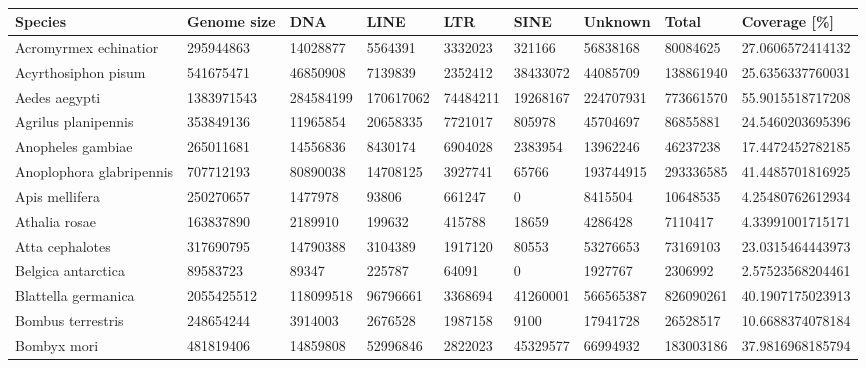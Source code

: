 \begin{table}[]
\caption{{\label{tab:coverage}}}
\begin{tabular}{@{}lllllllll@{}}
\toprule
Species                    & Genome size & DNA       & LINE      & LTR       & SINE      & Unknown    & Total      & Coverage {[}\%{]} \\ \midrule
Acromyrmex echinatior      & 295944863   & 14028877  & 5564391   & 3332023   & 321166    & 56838168   & 80084625   & 27.0606572414132  \\
Acyrthosiphon pisum        & 541675471   & 46850908  & 7139839   & 2352412   & 38433072  & 44085709   & 138861940  & 25.6356337760031  \\
Aedes aegypti              & 1383971543  & 284584199 & 170617062 & 74484211  & 19268167  & 224707931  & 773661570  & 55.9015518717208  \\
Agrilus planipennis        & 353849136   & 11965854  & 20658335  & 7721017   & 805978    & 45704697   & 86855881   & 24.5460203695396  \\
Anopheles gambiae          & 265011681   & 14556836  & 8430174   & 6904028   & 2383954   & 13962246   & 46237238   & 17.4472452782185  \\
Anoplophora glabripennis   & 707712193   & 80890038  & 14708125  & 3927741   & 65766     & 193744915  & 293336585  & 41.4485701816925  \\
Apis mellifera             & 250270657   & 1477978   & 93806     & 661247    & 0         & 8415504    & 10648535   & 4.25480762612934  \\
Athalia rosae              & 163837890   & 2189910   & 199632    & 415788    & 18659     & 4286428    & 7110417    & 4.33991001715171  \\
Atta cephalotes            & 317690795   & 14790388  & 3104389   & 1917120   & 80553     & 53276653   & 73169103   & 23.0315464443973  \\
Belgica antarctica         & 89583723    & 89347     & 225787    & 64091     & 0         & 1927767    & 2306992    & 2.57523568204461  \\
Blattella germanica        & 2055425512  & 118099518 & 96796661  & 3368694   & 41260001  & 566565387  & 826090261  & 40.1907175023913  \\
Bombus terrestris          & 248654244   & 3914003   & 2676528   & 1987158   & 9100      & 17941728   & 26528517   & 10.6688374078184  \\
Bombyx mori                & 481819406   & 14859808  & 52996846  & 2822023   & 45329577  & 66994932   & 183003186  & 37.9816968185794  \\

\end{tabular}
\end{table}

